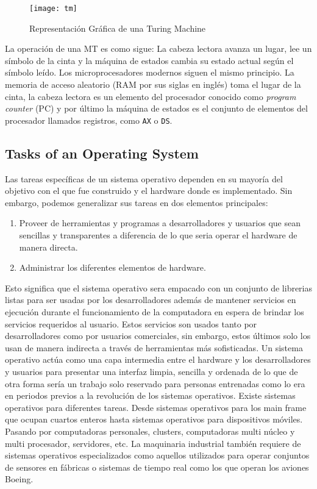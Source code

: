 \begin{figure}[htbp]
  \centering
  \texttt{[image: tm]}
  \caption{Representación Gráfica de una Turing Machine}
  \label{fig:tm}
\end{figure}

La operación de una MT es como sigue: La cabeza lectora avanza un lugar, lee un
símbolo de la cinta y la máquina de estados cambia su estado actual según el
símbolo leído.  Los microprocesadores modernos siguen el mismo principio. La
memoria de acceso aleatorio (RAM por sus siglas en inglés) toma el lugar de la
cinta, la cabeza lectora es un elemento del procesador conocido como
\emph{program counter} (PC) y por último la máquina de estados es el conjunto
de elementos del procesador llamados registros, como \texttt{AX} o \texttt{DS}.

\subsection{Tasks of an Operating System}

Las tareas específicas de un sistema operativo dependen en su mayoría del
objetivo con el que fue construido y el hardware donde es implementado. Sin
embargo, podemos generalizar sus tareas en dos elementos principales:

\begin{enumerate}
\item Proveer de herramientas y programas a desarrolladores y usuarios que sean
sencillas y transparentes a diferencia de lo que seria operar el hardware de
manera directa.
\item Administrar los diferentes elementos de hardware.
\end{enumerate}

Esto significa que el sistema operativo sera empacado con un conjunto de
librerias listas para ser usadas por los desarrolladores además de mantener
servicios en ejecución durante el funcionamiento de la computadora en espera de
brindar los servicios requeridos al usuario. Estos servicios son usados tanto
por desarrolladores como por usuarios comerciales, sin embargo, estos últimos
solo los usan de manera indirecta a través de herramientas más sofisticadas.
Un sistema operativo actúa como una capa intermedia entre el hardware y los
desarrolladores y usuarios para presentar una interfaz limpia, sencilla y
ordenada de lo que de otra forma sería un trabajo solo reservado para personas
entrenadas como lo era en periodos previos a la revolución de los sistemas
operativos.  Existe sistemas operativos para diferentes tareas. Desde sistemas
operativos para los main frame que ocupan cuartos enteros hasta sistemas
operativos para dispositivos móviles. Pasando por computadoras personales,
clusters, computadoras multi núcleo y multi procesador, servidores, etc.  La
maquinaria industrial también requiere de sistemas operativos especializados
como aquellos utilizados para operar conjuntos de sensores en fábricas o
sistemas de tiempo real como los que operan los aviones Boeing.

